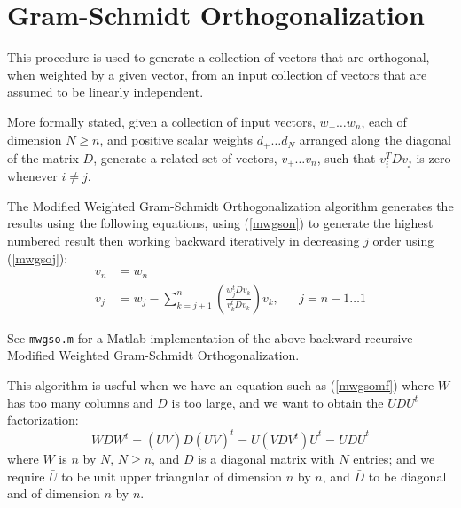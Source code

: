 \section{Gram-Schmidt Orthogonalization}

This procedure is used to generate a collection
of vectors that are orthogonal, when weighted by
a given vector, from an input collection of
vectors that are assumed to be linearly independent.

More formally stated,
given a collection of input vectors, $w_+ \dots w_n$,
each of dimension $N \ge n$,
and positive scalar weights $d_+ \dots d_N$
arranged along the diagonal of the matrix $D$,
generate a related set of vectors, $v_+ \dots v_n$,
such that $v_i^T D v_j$ is zero whenever $i \ne j$.

The Modified Weighted Gram-Schmidt Orthogonalization
algorithm generates the results using the following equations,
using (\ref{mwgson}) to generate the highest numbered result
then working backward iteratively in decreasing $j$ order
using (\ref{mwgsoj}):
\begin{subequations}
\label{mwgso}
\begin{align}
  v_n & = w_n
\label{mwgson}
\\
  v_j &= w_j - \sum_{k = j + 1}^{n}{
  \left( \frac{w_j^t D v_k}{v_k^t D v_k} \right)
  v_k
  }, && j = n-1 \dots 1
\label{mwgsoj}
\end{align}
\end{subequations}

See \verb|mwgso.m| for a Matlab implementation
of the above backward-recursive Modified Weighted
Gram-Schmidt Orthogonalization.

This algorithm is useful when we have an equation
such as (\ref{mwgsomf}) where $W$ has too many columns
and $D$ is too large, and we want to obtain the $UDU^t$
factorization:
\begin{equation}
W D W^t
= \left({\bar U} V\right) D \left({\bar U} V\right)^t
= {\bar U} \left( V D V^t \right) {\bar U}^t
= {\bar U} {\bar D} {\bar U}^t
\label{mwgsomf}
\end{equation}
where $W$ is $n$ by $N$, $N \ge n$,
and $D$ is a diagonal matrix with $N$ entries;
and we require ${\bar U}$ to be unit upper triangular
of dimension $n$ by $n$,
and ${\bar D}$ to be diagonal and
of dimension $n$ by $n$.

